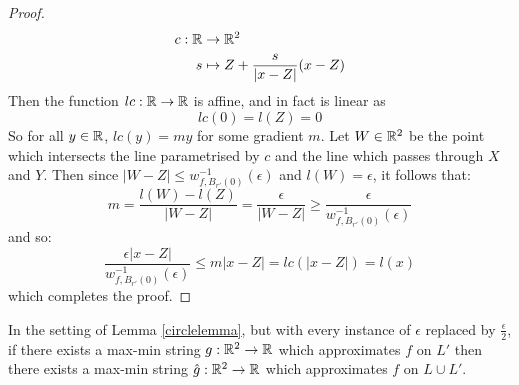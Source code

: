 \begin{proof}
\begin{align*}
    c: \mathbb{R} &\to \mathbb{R}^2\\
    s &\mapsto Z + \frac{s}{|x - Z|}(x - Z)
\end{align*}
Then the function $lc: \mathbb{R} \to \mathbb{R}$ is affine, and in fact is linear as
\[lc(0) = l(Z) = 0\]
So for all $y \in \mathbb{R}$, $lc(y) = my$ for some gradient $m$. Let $W \in \mathbb{R}^2$ be the point which intersects the line parametrised by $c$ and the line which passes through $X$ and $Y$. Then since $|W - Z| \leq w_{f,B_{r'}(0)}^{-1}(\epsilon)$ and $l(W) = \epsilon$, it follows that:
\[m = \frac{l(W) - l(Z)}{|W - Z|} = \frac{\epsilon}{|W - Z|} \geq \frac{\epsilon}{w_{f,B_{r'}(0)}^{-1}(\epsilon)}\]
and so:
\[\frac{\epsilon |x - Z|}{w_{f,B_{r'}(0)}^{-1}(\epsilon)} \leq m|x - Z| = lc(|x - Z|) = l(x)\]
which completes the proof.
\end{proof}
%
%
%
%
%
%
%
%
%
%
%
\begin{cor}
\label{cor:geometric-maxmin}
In the setting of Lemma \ref{circlelemma}, but with every instance of $\epsilon$ replaced by $\frac{\epsilon}{2}$, if there exists a max-min string $g: \mathbb{R}^2 \to \mathbb{R}$ which approximates $f$ on $L'$ then there exists a max-min string $\hat{g}: \mathbb{R}^2 \to \mathbb{R}$ which approximates $f$ on $L \cup L'$.
\end{cor}
%
%
%
%
%
%
%
%
%
%
%
